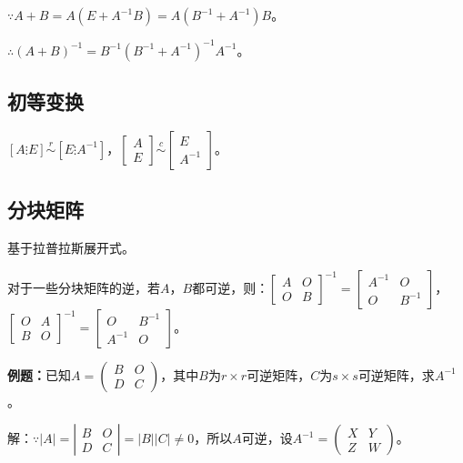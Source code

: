 \documentclass[UTF8, 12pt]{ctexart}
\begin{document}
$\because A+B=A(E+A^{-1}B)=A(B^{-1}+A^{-1})B$。

$\therefore (A+B)^{-1}=B^{-1}(B^{-1}+A^{-1})^{-1}A^{-1}$。

\subsection{初等变换}

$\left[A\vdots E\right]\overset{r}{\sim}\left[E\vdots A^{-1}\right]$，$\left[\begin{array}{c}
    A \\
    E
\end{array}\right]\overset{c}{\sim}\left[\begin{array}{c}
    E \\
    A^{-1}
\end{array}\right]$。

\subsection{分块矩阵}

基于拉普拉斯展开式。

对于一些分块矩阵的逆，若$A$，$B$都可逆，则：$\left[\begin{array}{cc}
    A & O \\
    O & B
\end{array}\right]^{-1}=\left[\begin{array}{cc}
    A^{-1} & O \\
    O & B^{-1}
\end{array}\right]$，$\left[\begin{array}{cc}
    O & A \\
    B & O
\end{array}\right]^{-1}=\left[\begin{array}{cc}
    O & B^{-1} \\
    A^{-1} & O
\end{array}\right]$。\medskip

\textbf{例题：}已知$A=\left(\begin{array}{cc}
    B & O \\
    D & C
\end{array}\right)$，其中$B$为$r\times r$可逆矩阵，$C$为$s\times s$可逆矩阵，求$A^{-1}$。

解：$\because\vert A\vert=\left|\begin{array}{cc}
    B & O \\
    D & C
\end{array}\right|=\vert B\vert\vert C\vert\neq0$，所以$A$可逆，设$A^{-1}=\left(\begin{array}{cc}
    X & Y \\
    Z & W
\end{array}\right)$。
\end{document}
